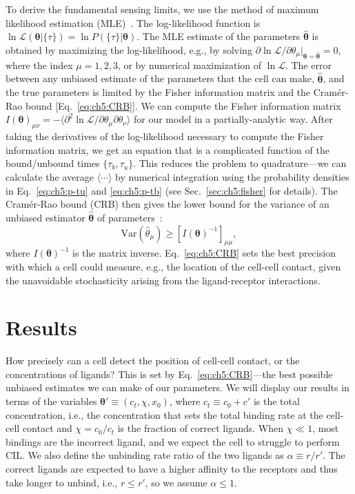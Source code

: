 To derive the fundamental sensing limits, we use the method of maximum likelihood estimation (MLE)~\cite{endres2009maximum, hu2011how, kay1993fundamentals}.
The log-likelihood function is $\ln\mathcal{L}(\boldsymbol{\theta}|\{\tau\})=\ln P(\{\tau\}|\boldsymbol{\theta})$.
The MLE estimate of the parameters $\hat{\boldsymbol{\theta}}$ is obtained by maximizing the log-likelihood, e.g., by solving $\partial\ln\mathcal{L}/\partial \theta_\mu|_{\boldsymbol{\theta} = \hat{\boldsymbol{\theta}}}=0$, where the index $\mu=1,2,3$, or by numerical maximization of $\ln\mathcal{L}$.
The error between any unbiased estimate of the parameters that the cell can make, $\hat{\boldsymbol{\theta}}$, and the true parameters is limited by the Fisher information matrix and the Cram\'{e}r-Rao bound [Eq.~\eqref{eq:ch5:CRB}].
We can compute the Fisher information matrix $I(\boldsymbol{\theta})_{\mu\nu}=-\langle\partial^2\ln\mathcal{L}/\partial\theta_\mu\partial\theta_\nu\rangle$ for our model in a partially-analytic way.
After taking the derivatives of the log-likelihood necessary to compute the Fisher information matrix, we get an equation that is a complicated function of the bound/unbound times $\{\tau_b,\tau_u\}$.
This reduces the problem to quadrature---we can calculate the average $\langle\cdots\rangle$ by numerical integration using the probability densities in Eq.~\eqref{eq:ch5:p-tu} and \eqref{eq:ch5:p-tb} (see Sec.~\ref{sec:ch5:fisher} for details).
The Cram\'{e}r-Rao bound (CRB) then gives the lower bound for the variance of an unbiased estimator $\hat{\boldsymbol{\theta}}$ of parameters~\cite{ipina2022collective}:
\begin{equation}\label{eq:ch5:CRB}
    \textrm{Var}({\hat{{\theta}}}_\mu)\geqslant [I(\boldsymbol{\theta})^{-1}]_{\mu\mu},
\end{equation}
where $I(\boldsymbol{\theta})^{-1}$ is the matrix inverse.
Eq.~\eqref{eq:ch5:CRB} sets the best precision with which a cell could measure, e.g., the location of the cell-cell contact, given the unavoidable stochasticity arising from the ligand-receptor interactions.


\section{Results}
\label{sec:ch5:results}

How precisely can a cell detect the position of cell-cell contact, or the concentrations of ligands?
This is set by Eq.~\eqref{eq:ch5:CRB}---the best possible unbiased estimates we can make of our parameters.
We will display our results in terms of the variables $\boldsymbol{\theta}'\equiv(c_t,\chi,x_0)$, where $c_t\equiv c_0+c'$ is the total concentration, i.e., the concentration that sets the total binding rate at the cell-cell contact and $\chi=c_0/c_t$ is the fraction of correct ligands.
When $\chi \ll 1$, most bindings are the incorrect ligand, and we expect the cell to struggle to perform CIL.
We also define the unbinding rate ratio of the two ligands as $\alpha\equiv r/r'$.
The correct ligands are expected to have a higher affinity to the receptors and thus take longer to unbind, i.e., $r\leqslant r'$, so we assume $\alpha\leqslant 1$.

